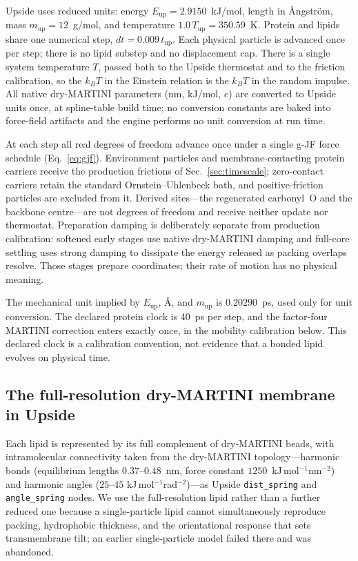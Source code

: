 \documentclass[journal=jctcce,manuscript=article,layout=twocolumn]{achemso}
\begin{document}
Upside uses reduced units: energy $E_\mathrm{up}=2.9150$~kJ/mol, length in
\AA{}ngstr\"om, mass $m_\mathrm{up}=12$~g/mol, and temperature
$1.0\,T_\mathrm{up}=350.59$~K. Protein and lipids share one numerical step,
$dt=0.009\,t_\mathrm{up}$. Each physical particle is advanced once per step; there is
no lipid substep and no displacement cap. There is a single system temperature $T$,
passed both to the Upside thermostat and to the friction calibration, so the $k_BT$
in the Einstein relation is the $k_BT$ in the random impulse. All native dry-MARTINI
parameters (nm, kJ/mol, $e$) are converted to Upside units once, at spline-table
build time; no conversion constants are baked into force-field artifacts and the
engine performs no unit conversion at run time.

At each step all real degrees of freedom advance once under a single g-JF force
schedule (Eq.~\ref{eq:gjf}). Environment particles and membrane-contacting protein
carriers receive the production frictions of Sec.~\ref{sec:timescale}; zero-contact
carriers retain the standard Ornstein--Uhlenbeck bath, and positive-friction
particles are excluded from it. Derived sites---the regenerated carbonyl~O and the
backbone centre---are not degrees of freedom and receive neither update nor
thermostat. Preparation damping is deliberately separate from production
calibration: softened early stages use native dry-MARTINI damping and full-core
settling uses strong damping to dissipate the energy released as packing overlaps
resolve. Those stages prepare coordinates; their rate of motion has no physical
meaning.

The mechanical unit implied by $E_\mathrm{up}$, \AA, and $m_\mathrm{up}$ is
$0.20290$~ps, used only for unit conversion. The declared protein clock is 40~ps per
step, and the factor-four MARTINI correction enters exactly once, in the mobility
calibration below. This declared clock is a calibration convention, not evidence
that a bonded lipid evolves on physical time.

\subsection{The full-resolution dry-MARTINI membrane in Upside}
\label{sec:membrane}

Each lipid is represented by its full complement of dry-MARTINI beads, with
intramolecular connectivity taken from the dry-MARTINI topology---harmonic bonds
(equilibrium lengths $0.37$--$0.48$~nm, force constant
$1250$~kJ\,mol$^{-1}$nm$^{-2}$) and harmonic angles ($25$--$45$
kJ\,mol$^{-1}$rad$^{-2}$)---as Upside \texttt{dist\_spring} and
\texttt{angle\_spring} nodes. We use the full-resolution lipid rather than a further
reduced one because a single-particle lipid cannot simultaneously reproduce packing,
hydrophobic thickness, and the orientational response that sets transmembrane tilt;
an earlier single-particle model failed there and was abandoned.
\end{document}
